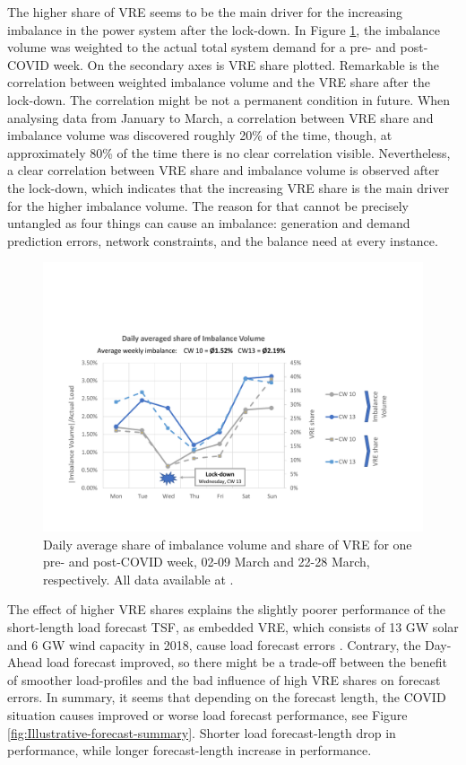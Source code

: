 \documentclass[energies,article,submit,moreauthors,pdftex]{Definitions/mdpi}
\begin{document}
The higher share of VRE seems to be the main driver for the increasing imbalance in the power system after the lock-down. In Figure \ref{fig:ImbalanceVolume-daily}, the imbalance volume was weighted to the actual total system demand for a pre- and post-COVID week. On the secondary axes is VRE share plotted. Remarkable is the correlation between weighted imbalance volume and the VRE share after the lock-down. The correlation might be not a permanent condition in future. When analysing data from January to March, a correlation between VRE share and imbalance volume was discovered roughly 20\% of the time, though, at approximately 80\% of the time there is no clear correlation visible. Nevertheless, a clear correlation between VRE share and imbalance volume is observed after the lock-down, which indicates that the increasing VRE share is the main driver for the higher imbalance volume. The reason for that cannot be precisely untangled as four things can cause an imbalance: generation and demand prediction errors, network constraints, and the balance need at every instance. 

\begin{figure}[H]
\centering
\hspace{-25pt}\includegraphics[trim={0cm 2cm 2.5cm 4cm},clip,width=1\textwidth]{Graphics/Illustration-Imbalance-2weeks.pdf}
\caption{Daily average share of imbalance volume and share of VRE for one pre- and post-COVID week, 02-09 March and 22-28 March, respectively. All data available at \protect\cite{ELEXON2020ELEXONBMRS}.}\label{fig:ImbalanceVolume-daily}
\end{figure} 

The effect of higher VRE shares explains the slightly poorer performance of the short-length load forecast TSF, as embedded VRE, which consists of 13 GW solar and 6 GW wind capacity in 2018,  cause load forecast errors \cite{NationalgridESO2018QuarterlyMarch18, NationalGridESO2019EnergyRoadmap}. Contrary, the Day-Ahead load forecast improved, so there might be a trade-off between the benefit of smoother load-profiles and the bad influence of high VRE shares on forecast errors. In summary, it seems that depending on the forecast length, the COVID situation causes improved or worse load forecast performance, see Figure \ref{fig:Illustrative-forecast-summary}. Shorter load forecast-length drop in performance, while longer forecast-length increase in performance.
\end{document}
